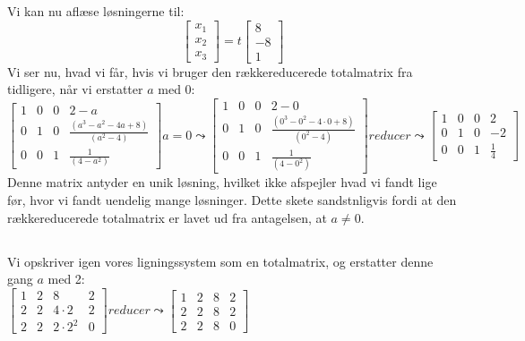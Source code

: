 \documentclass[a4paper,12pt]{article}
\begin{document}
Vi kan nu aflæse løsningerne til:
\[
\left[\begin{array}{c}
    x_1 \\
    x_2 \\
    x_3
\end{array}\right]
=
t
\left[\begin{array}{c}
    8 \\
    -8 \\
    1
\end{array}\right]
\]
Vi ser nu, hvad vi får, hvis vi bruger den rækkereducerede totalmatrix fra tidligere, når vi erstatter $a$ med 0:\\

$
\left[\begin{array}{ccc|c}
    1 & 0 & 0 & 2-a \\
    0 & 1 & 0 & \frac{(a^3 - a^2 - 4a + 8)}{(a^2 - 4)} \\
    0 & 0 & 1 & \frac{1}{(4-a^2)}
\end{array}\right]
a=0
\leadsto
\left[\begin{array}{ccc|c}
    1 & 0 & 0 & 2-0 \\
    0 & 1 & 0 & \frac{(0^3 - 0^2 - 4\cdot0 + 8)}{(0^2 - 4)} \\
    0 & 0 & 1 & \frac{1}{(4-0^2)}
\end{array}\right]
reducer
\leadsto
\left[\begin{array}{ccc|c}
    1 & 0 & 0 & 2 \\
    0 & 1 & 0 & -2 \\
    0 & 0 & 1 & \frac{1}{4}
\end{array}\right]
$\\

Denne matrix antyder en unik løsning, hvilket ikke afspejler hvad vi fandt lige før, hvor vi fandt uendelig mange løsninger. Dette skete sandstnligvis fordi at den rækkereducerede totalmatrix er lavet ud fra antagelsen, at $a \neq 0$.

\subsection{}
Vi opskriver igen vores ligningssystem som en totalmatrix, og erstatter denne gang $a$ med 2:\\

$
\left[\begin{array}{ccc|c}
    1 & 2 & 8 & 2 \\
    2 & 2 & 4\cdot2 & 2 \\
    2 & 2 & 2\cdot2^2 & 0
\end{array}\right]
reducer
\leadsto
\left[\begin{array}{ccc|c}
    1 & 2 & 8 & 2 \\
    2 & 2 & 8 & 2 \\
    2 & 2 & 8 & 0
\end{array}\right]
$\\
\end{document}
